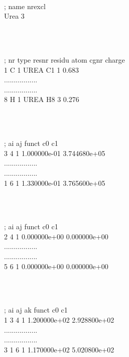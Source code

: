 \begin{tt}
[ moleculetype ]\\
; name  nrexcl\\
Urea       3\\
\end{tt}\\
\begin{tt}
[ atoms ]\\
;   nr    type   resnr  residu    atom    cgnr  charge\\
     1       C       1    UREA      C1       1   0.683  \\
     .................\\
     .................\\
     8       H       1    UREA      H8       3   0.276\\
\end{tt}\\
\begin{tt}
[ bonds ]\\
;  ai    aj funct           c0           c1\\
    3     4     1 1.000000e-01 3.744680e+05 \\
     .................\\
     .................\\
    1     6     1 1.330000e-01 3.765600e+05 \\
\end{tt}\\
\begin{tt}
[ pairs ]\\
;  ai    aj funct           c0           c1\\
    2     4     1 0.000000e+00 0.000000e+00 \\
     .................\\
     .................\\
    5     6     1 0.000000e+00 0.000000e+00 \\
\end{tt}\\
\begin{tt}
[ angles ]\\
;  ai    aj    ak funct           c0           c1\\
    1     3     4     1 1.200000e+02 2.928800e+02 \\
     .................\\
     .................\\
    3     1     6     1 1.170000e+02 5.020800e+02 \\
\end{tt}\\
